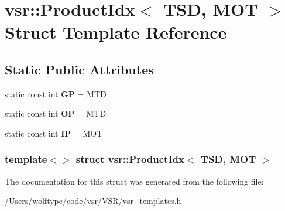\hypertarget{structvsr_1_1_product_idx_3_01_t_s_d_00_01_m_o_t_01_4}{\section{vsr\-:\-:Product\-Idx$<$ T\-S\-D, M\-O\-T $>$ Struct Template Reference}
\label{structvsr_1_1_product_idx_3_01_t_s_d_00_01_m_o_t_01_4}
}
\subsection*{Static Public Attributes}
\begin{DoxyCompactItemize}
\item 
\hypertarget{structvsr_1_1_product_idx_3_01_t_s_d_00_01_m_o_t_01_4_aa11e9a5d72ec2434f91caac9689b8f63}{static const int {\bfseries G\-P} = M\-T\-D}\label{structvsr_1_1_product_idx_3_01_t_s_d_00_01_m_o_t_01_4_aa11e9a5d72ec2434f91caac9689b8f63}

\item 
\hypertarget{structvsr_1_1_product_idx_3_01_t_s_d_00_01_m_o_t_01_4_af5e8bc9a5a0d163b847a8f1929a62931}{static const int {\bfseries O\-P} = M\-T\-D}\label{structvsr_1_1_product_idx_3_01_t_s_d_00_01_m_o_t_01_4_af5e8bc9a5a0d163b847a8f1929a62931}

\item 
\hypertarget{structvsr_1_1_product_idx_3_01_t_s_d_00_01_m_o_t_01_4_a6d0fe8920832cc2d007c55a4127499b9}{static const int {\bfseries I\-P} = M\-O\-T}\label{structvsr_1_1_product_idx_3_01_t_s_d_00_01_m_o_t_01_4_a6d0fe8920832cc2d007c55a4127499b9}

\end{DoxyCompactItemize}
\subsubsection*{template$<$$>$ struct vsr\-::\-Product\-Idx$<$ T\-S\-D, M\-O\-T $>$}



The documentation for this struct was generated from the following file\-:\begin{DoxyCompactItemize}
\item 
/\-Users/wolftype/code/vsr/\-V\-S\-R/vsr\-\_\-templates.\-h\end{DoxyCompactItemize}
